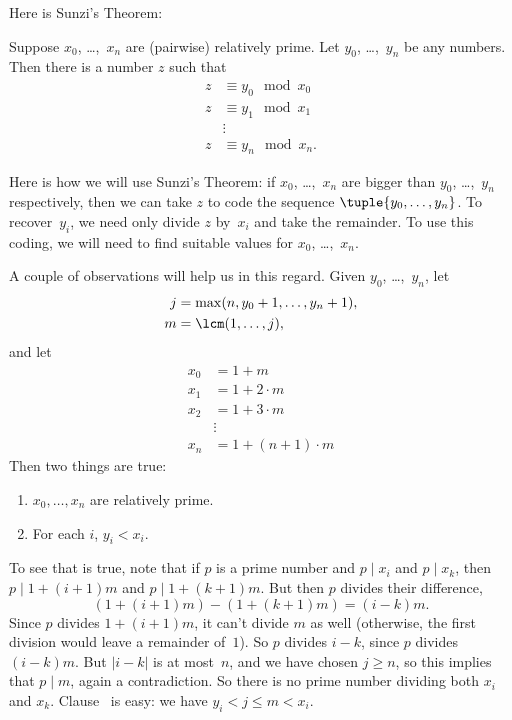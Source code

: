 \documentclass[../../../include/open-logic-section]{subfiles}
\begin{document}
Here is Sunzi's Theorem:
\begin{thm}
Suppose $x_0$, \dots,~$x_n$ are (pairwise) relatively prime. Let
$y_0$, \dots,~$y_n$ be any numbers. Then there is a number $z$ such that
\begin{align*}
z & \equiv y_0 \mod x_0 \\
z & \equiv y_1 \mod x_1 \\
& \vdots  \\
z & \equiv y_n \mod x_n.
\end{align*}
\end{thm}

Here is how we will use Sunzi's Theorem: if $x_0$,
\dots,~$x_n$ are bigger than $y_0$, \dots,~$y_n$ respectively, then we
can take $z$ to code the sequence $\tuple{y_0, \dots,y_n}$. To
recover~$y_i$, we need only divide $z$ by~$x_i$ and take the
remainder. To use this coding, we will need to find suitable values
for $x_0$, \dots,~$x_n$.

A couple of observations will help us in this regard. Given
$y_0$, \dots,~$y_n$, let
\begin{align*}
j &= \max(n, y_0 + 1, \dots, y_n + 1), \\
m &= \lcm(1,\dots,j),
\end{align*}
and let
\begin{align*}
x_0 & = 1 + m \\
x_1 & = 1 + 2 \cdot m \\
x_2 & = 1 + 3 \cdot m \\
& \vdots  \\
x_n & = 1 + (n+1) \cdot m
\end{align*}
Then two things are true:
\begin{enumerate}
\item{} $x_0,\dots,x_n$ are relatively prime.
\item{} For each $i$, $y_i < x_i$.
\end{enumerate}
To see that  is true, note that if $p$ is a prime number
and $p \mid x_i$ and $p \mid x_k$, then $p \mid 1 + (i+1) m$ and
$p \mid 1 + (k+1) m$. But then $p$ divides their difference,
\[
(1 + (i+1)m) - (1+ (k+1)m) = (i-k) m.
\]
Since $p$ divides $1 + (i+1)m$, it can't divide $m$ as well
(otherwise, the first division would leave a remainder of~$1$). So $p$
divides $i-k$, since $p$ divides $(i-k)m$. But $\left|i-k\right|$ is at
most~$n$, and we have chosen $j \geq n$, so this implies that
$p \mid m$, again a contradiction. So there is no prime number dividing
both $x_i$ and $x_k$. Clause~ is easy:
we have $y_i < j \leq m < x_i$.
\end{document}
